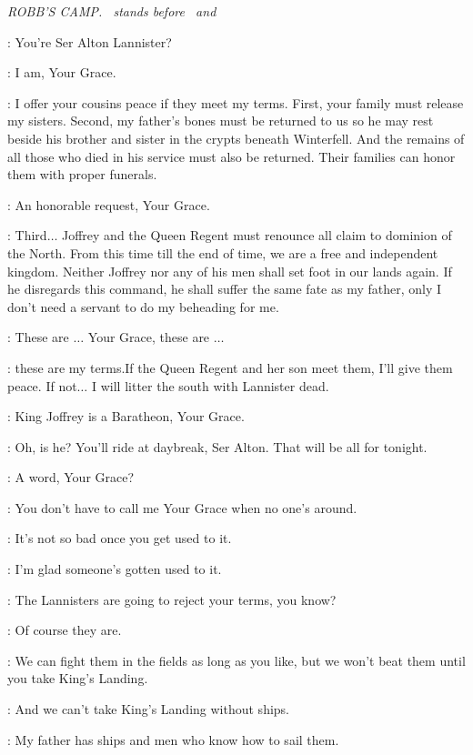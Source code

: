 \scene

\textit{ROBB'S CAMP.  \ALTON ~stands before \ROBB ~and \THEON}

\ROBB: You're Ser Alton Lannister?

\ALTON: I am, Your Grace.

\ROBB: I offer your cousins peace if they meet my terms. First, your family must release my sisters. Second, my father's bones must be returned to us so he may rest beside his brother and sister in the crypts beneath Winterfell. And the remains of all those who died in his service must also be returned. Their families can honor them with proper funerals.

\ALTON: An honorable request, Your Grace.

\ROBB: Third$\ldots$ Joffrey and the Queen Regent must renounce all claim to dominion of the North. From this time till the end of time, we are a free and independent kingdom. Neither Joffrey nor any of his men shall set foot in our lands again. If he disregards this command, he shall suffer the same fate as my father, only I don't need a servant to do my beheading for me.

\ALTON: These are $\ldots$ Your Grace, these are $\ldots$

\ROBB: these are my terms.If the Queen Regent and her son meet them, I'll give them peace. If not$\ldots$ I will litter the south with Lannister dead.

\ALTON: King Joffrey is a Baratheon, Your Grace.

\ROBB: Oh, is he? You'll ride at daybreak, Ser Alton. That will be all for tonight.


\THEON: A word, Your Grace?

\ROBB: You don't have to call me Your Grace when no one's around.

\THEON: It's not so bad once you get used to it.

\ROBB: I'm glad someone's gotten used to it.

\THEON: The Lannisters are going to reject your terms, you know?

\ROBB: Of course they are.

\THEON: We can fight them in the fields as long as you like, but we won't beat them until you take King's Landing.

\ROBB: And we can't take King's Landing without ships.

\THEON: My father has ships and men who know how to sail them.

